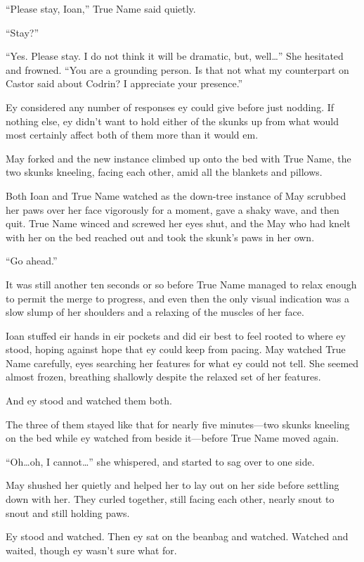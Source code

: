 ``Please stay, Ioan,'' True Name said quietly.

``Stay?''

``Yes. Please stay. I do not think it will be dramatic, but, well\ldots{}'' She hesitated and frowned. ``You are a grounding person. Is that not what my counterpart on Castor said about Codrin? I appreciate your presence.''

Ey considered any number of responses ey could give before just nodding. If nothing else, ey didn't want to hold either of the skunks up from what would most certainly affect both of them more than it would em.

May forked and the new instance climbed up onto the bed with True Name, the two skunks kneeling, facing each other, amid all the blankets and pillows.

Both Ioan and True Name watched as the down-tree instance of May scrubbed her paws over her face vigorously for a moment, gave a shaky wave, and then quit. True Name winced and screwed her eyes shut, and the May who had knelt with her on the bed reached out and took the skunk's paws in her own.

``Go ahead.''

It was still another ten seconds or so before True Name managed to relax enough to permit the merge to progress, and even then the only visual indication was a slow slump of her shoulders and a relaxing of the muscles of her face.

Ioan stuffed eir hands in eir pockets and did eir best to feel rooted to where ey stood, hoping against hope that ey could keep from pacing. May watched True Name carefully, eyes searching her features for what ey could not tell. She seemed almost frozen, breathing shallowly despite the relaxed set of her features.

And ey stood and watched them both.

The three of them stayed like that for nearly five minutes—two skunks kneeling on the bed while ey watched from beside it—before True Name moved again.

``Oh\ldots oh, I cannot\ldots{}'' she whispered, and started to sag over to one side.

May shushed her quietly and helped her to lay out on her side before settling down with her. They curled together, still facing each other, nearly snout to snout and still holding paws.

Ey stood and watched. Then ey sat on the beanbag and watched. Watched and waited, though ey wasn't sure what for.

